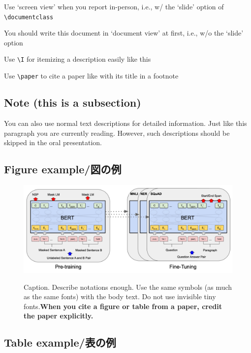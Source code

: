 \documentclass[]{lrlabreport}
\begin{document}
\I Use `screen view' when you report in-person, i.e., w/ the `slide' option of \verb|\documentclass|

\I You should write this document in `document view' at first, i.e., w/o the `slide' option


\I Use \verb|\I| for itemizing a description easily like this

\I Use \verb|\paper| to cite a paper like  with its title in a footnote

\subsection{Note (this is a subsection)}
{\small \redcolor You can also use normal text descriptions for detailed information. Just like this paragraph you are currently reading. However, such descriptions should be skipped in the oral presentation.}

\subsection{Figure example/図の例}

\begin{figure}[H] %
    \centering
    \includegraphics[width=.9\linewidth]{bert_aclanth_N19-1423_fig-1.pdf}
    \\{\tiny \cite[Figure 1]{devlin-etal-2019-bert}}
    \caption{\footnotesize Caption. Describe notations enough. Use the same symbols (as much as the same fonts) with the body text. Do not use invisible tiny fonts.\bf When you cite a figure or table from a paper, credit the paper explicitly.}
    \label{fig:architecture}
\end{figure}

\subsection{Table example/表の例}
\end{document}
